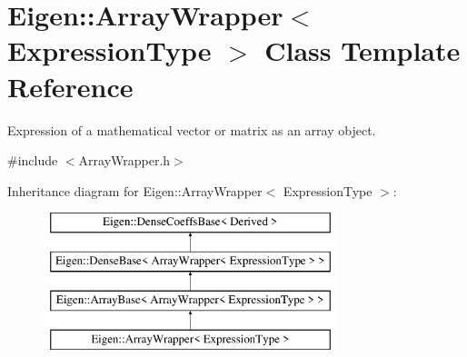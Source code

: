 \hypertarget{class_eigen_1_1_array_wrapper}{}\section{Eigen\+::Array\+Wrapper$<$ Expression\+Type $>$ Class Template Reference}
\label{class_eigen_1_1_array_wrapper}


Expression of a mathematical vector or matrix as an array object.  




{\ttfamily \#include $<$Array\+Wrapper.\+h$>$}

Inheritance diagram for Eigen\+::Array\+Wrapper$<$ Expression\+Type $>$\+:\begin{figure}[H]
\begin{center}
\leavevmode
\includegraphics[height=4.000000cm]{class_eigen_1_1_array_wrapper}
\end{center}
\end{figure}
